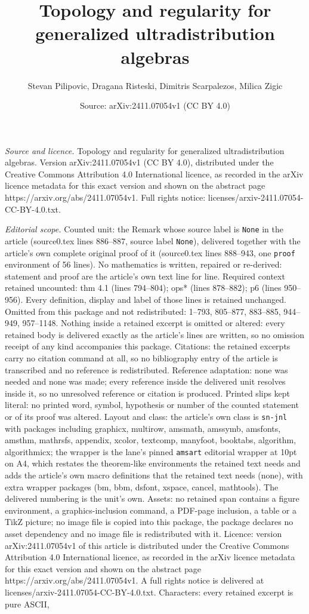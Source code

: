 \documentclass[10pt,a4paper]{amsart}
\title[Topology and regularity for generalized ultradistribution al]{Topology and regularity for generalized ultradistribution algebras}
\author{Stevan Pilipovic, Dragana Risteski, Dimitris Scarpalezos, Milica Zigic}
\date{Source: arXiv:2411.07054v1 (CC BY 4.0)}
\begin{document}
\maketitle

\noindent\emph{Source and licence.} Topology and regularity for generalized ultradistribution algebras. Version arXiv:2411.07054v1 (CC BY 4.0), distributed under the Creative Commons Attribution 4.0 International licence, as recorded in the arXiv licence metadata for this exact version and shown on the abstract page https://arxiv.org/abs/2411.07054v1. Full rights notice: licenses/arxiv-2411.07054-CC-BY-4.0.txt.\par\smallskip

\noindent\textit{Editorial scope.} Counted unit: the Remark whose source label is \texttt{None} in the article (source0.tex lines 886--887, source label \texttt{None}), delivered together with the article's own complete original proof of it (source0.tex lines 888--943, one \texttt{proof} environment of 56 lines). No mathematics is written, repaired or re-derived: statement and proof are the article's own text line for line. Required context retained uncounted: thm 4.1 (lines 794--804); ops* (lines 878--882); p6 (lines 950--956). Every definition, display and label of those lines is retained unchanged. Omitted from this package and not redistributed: 1--793, 805--877, 883--885, 944--949, 957--1148. Nothing inside a retained excerpt is omitted or altered: every retained body is delivered exactly as the article's lines are written, so no omission receipt of any kind accompanies this package. Citations: the retained excerpts carry no citation command at all, so no bibliography entry of the article is transcribed and no reference is redistributed. Reference adaptation: none was needed and none was made; every reference inside the delivered unit resolves inside it, so no unresolved reference or citation is produced. Printed slips kept literal: no printed word, symbol, hypothesis or number of the counted statement or of its proof was altered. Layout and class: the article's own class is \texttt{sn-jnl} with packages including graphicx, multirow, amsmath, amssymb, amsfonts, amsthm, mathrsfs, appendix, xcolor, textcomp, manyfoot, booktabs, algorithm, algorithmicx; the wrapper is the lane's pinned \texttt{amsart} editorial wrapper at 10pt on A4, which restates the theorem-like environments the retained text needs and adds the article's own macro definitions that the retained text needs (none), with extra wrapper packages (bm, bbm, dsfont, xspace, cancel, mathtools). The delivered numbering is the unit's own. Assets: no retained span contains a figure environment, a graphics-inclusion command, a PDF-page inclusion, a table or a TikZ picture; no image file is copied into this package, the package declares no asset dependency and no image file is redistributed with it. Licence: version arXiv:2411.07054v1 of this article is distributed under the Creative Commons Attribution 4.0 International licence, as recorded in the arXiv licence metadata for this exact version and shown on the abstract page https://arxiv.org/abs/2411.07054v1. A full rights notice is delivered at licenses/arxiv-2411.07054-CC-BY-4.0.txt. Characters: every retained excerpt is pure ASCII, 
\end{document}
